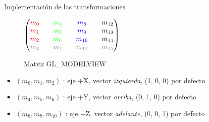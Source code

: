 \documentclass{beamer}
\begin{document}
\begin{frame}{Implementación de las transformaciones}
  \begin{figure}[ht]
  \centering
  \(
  \begin{pmatrix}
    \textcolor{red}{m_0} && \textcolor{green}{m_4} && \textcolor{blue}{m_8} && m_{12}\\
    \textcolor{red}{m_1} && \textcolor{green}{m_5} && \textcolor{blue}{m_9} && m_{13}\\
    \textcolor{red}{m_2} && \textcolor{green}{m_6} && \textcolor{blue}{m_{10}} && m_{14}\\
    \textcolor{gray}{m_3} && \textcolor{gray}{m_7} && \textcolor{gray}{m_{11}} && \textcolor{gray}{m_{15}}
  \end{pmatrix}
  \)
  \caption*{Matriz GL\_MODELVIEW}
\end{figure}
\begin{itemize}
\item{\((m_0, m_1, m_2)\) : eje +X, vector \textit{izquierda}, (1, 0, 0) por defecto}
\item{\((m_4, m_5, m_6)\) : eje +Y, vector \textit{arriba}, (0, 1, 0) por defecto}
\item{\((m_8, m_9, m_{10})\) : eje +Z, vector \textit{adelante}, (0, 0, 1) por defecto}
\end{itemize}
\end{frame}
\end{document}
